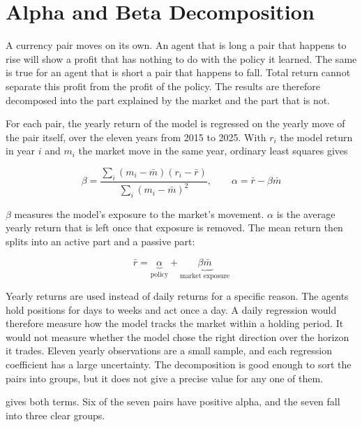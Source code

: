\section{Alpha and Beta Decomposition}
\label{Section:AlphaBeta}

A currency pair moves on its own. An agent that is long a pair that happens to rise will show a profit that has nothing to do with the policy it learned. The same is true for an agent that is short a pair that happens to fall. Total return cannot separate this profit from the profit of the policy. The results are therefore decomposed into the part explained by the market and the part that is not.

For each pair, the yearly return of the model is regressed on the yearly move of the pair itself, over the eleven years from 2015 to 2025. With $r_i$ the model return in year $i$ and $m_i$ the market move in the same year, ordinary least squares gives

\begin{equation}
\beta = \frac{\sum_i (m_i - \bar{m})(r_i - \bar{r})}{\sum_i (m_i - \bar{m})^2}, \qquad \alpha = \bar{r} - \beta \bar{m}
\label{Equation:AlphaBeta}
\end{equation}

$\beta$ measures the model's exposure to the market's movement. $\alpha$ is the average yearly return that is left once that exposure is removed. The mean return then splits into an active part and a passive part:

\begin{equation}
\bar{r} = \underbrace{\alpha}_{\text{policy}} + \underbrace{\beta \bar{m}}_{\text{market exposure}}
\label{Equation:AlphaDecomposition}
\end{equation}

Yearly returns are used instead of daily returns for a specific reason. The agents hold positions for days to weeks and act once a day. A daily regression would therefore measure how the model tracks the market within a holding period. It would not measure whether the model chose the right direction over the horizon it trades. Eleven yearly observations are a small sample, and each regression coefficient has a large uncertainty. The decomposition is good enough to sort the pairs into groups, but it does not give a precise value for any one of them.

 gives both terms. Six of the seven pairs have positive alpha, and the seven fall into three clear groups.

